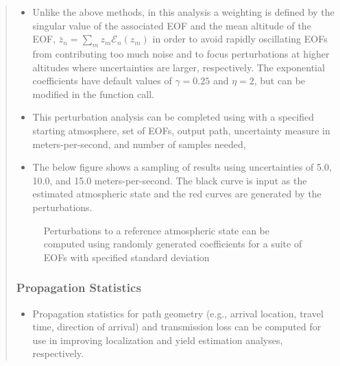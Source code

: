 \documentclass[letterpaper,10pt,english]{sphinxmanual}
\let\sphinxpxdimen\pdfpxdimen\else\newdimen\sphinxpxdimen
\begin{document}
\begin{itemize}
\begin{quote}
\begin{itemize}
\item {} 
Unlike the above methods, in this analysis a weighting is defined by the singular value of the associated EOF and the mean altitude of the EOF, \(\bar{z}_n = \sum_m{z_m \mathcal{E}_n \left( z_m \right)}\) in order to avoid rapidly oscillating EOFs from contributing too much noise and to focus perturbations at higher altitudes where uncertainties are larger, respectively.  The exponential coefficients have default values of \(\gamma = 0.25\) and \(\eta=2\), but can be modified in the function call.

\item {} 
This perturbation analysis can be completed using  with a specified starting atmosphere, set of EOFs, output path, uncertainty measure in meters-per-second, and number of samples needed,

\end{itemize}

\begin{sphinxVerbatim}[commandchars=\\\{\}]
    
\end{sphinxVerbatim}
\begin{itemize}
\item {} 
The below figure shows a sampling of results using uncertainties of 5.0, 10.0, and 15.0 meters-per-second.  The black curve is input as the estimated atmospheric state and the red curves are generated by the perturbations.

\end{itemize}

\begin{figure}[htbp]
\centering
\capstart

\noindent\sphinxincludegraphics[width=500\sphinxpxdimen]{{atmo_perturb}.png}
\caption{Perturbations to a reference atmospheric state can be computed using randomly generated coefficients for a suite of EOFs with specified standard deviation}\label{\detokenize{sampling:id3}}\end{figure}


\subsubsection{Propagation Statistics}
\label{\detokenize{propagation:propagation-statistics}}\label{\detokenize{propagation:propagation}}\label{\detokenize{propagation::doc}}\begin{itemize}
\item {} 
Propagation statistics for path geometry (e.g., arrival location, travel time, direction of arrival) and transmission loss can be computed for use in improving localization and yield estimation analyses, respectively.


\end{itemize}
\end{quote}
\end{itemize}
\end{document}
